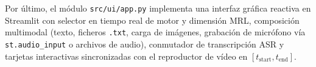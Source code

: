 Por último, el módulo \texttt{src/ui/app.py} implementa una interfaz gráfica reactiva en Streamlit con selector en tiempo real de motor y dimensión MRL, composición multimodal (texto, ficheros \texttt{.txt}, carga de imágenes, grabación de micrófono vía \texttt{st.audio\_input} o archivos de audio), conmutador de transcripción ASR y tarjetas interactivas sincronizadas con el reproductor de vídeo en $[t_{\text{start}}, t_{\text{end}}]$.
